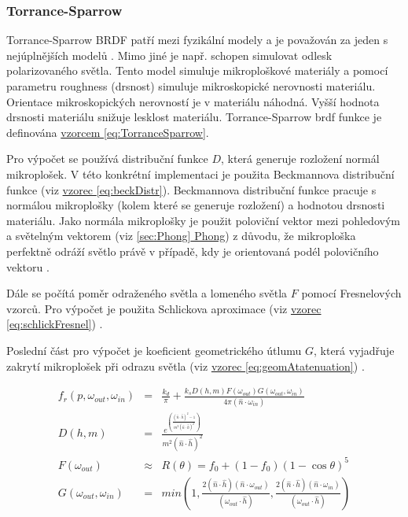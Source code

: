 \documentclass[czech,master,dept460,male,cpp,cpdeclaration]{diploma}
\newcommand{\uvec}[1]{\hat{#1}}
\begin{document}
\subsubsection{Torrance-Sparrow} \label{sec:torrancesparrow}
Torrance-Sparrow BRDF patří mezi fyzikální modely a je považován za jeden s nejúplnějších modelů \cite{BRDFOverview}. Mimo jiné je např. schopen simulovat odlesk polarizovaného světla. Tento model simuluje mikroploškové materiály a pomocí parametru roughness (drsnost) simuluje mikroskopické nerovnosti materiálu. Orientace mikroskopických nerovností je v materiálu náhodná. Vyšší hodnota drsnosti materiálu snižuje lesklost materiálu. Torrance-Sparrow brdf funkce je definována \hyperref[eq:TorranceSparrow]{vzorcem \ref{eq:TorranceSparrow}}. \par
Pro výpočet se používá distribuční funkce \(D\), která generuje rozložení normál mikroplošek. V této konkrétní implementaci je použita Beckmannova distribuční funkce (viz \hyperref[eq:beckDistr]{vzorec \ref{eq:beckDistr}}). Beckmannova distribuční funkce pracuje s normálou mikroplošky (kolem které se generuje rozložení) a hodnotou drsnosti materiálu. Jako normála mikroplošky je použit poloviční vektor mezi pohledovým a světelným vektorem (viz \hyperref[sec:Phong]{\ref{sec:Phong} Phong}) z důvodu, že mikroploška perfektně odráží světlo právě v případě, kdy je orientovaná podél polovičního vektoru \cite{PHARR2017507}. \par
Dále se počítá poměr odraženého světla a lomeného světla \(F\) pomocí Fresnelových vzorců. Pro výpočet je použita Schlickova aproximace (viz \hyperref[eq:schlickFresnel]{vzorec \ref{eq:schlickFresnel}}) \cite{SchlickFresnel}. \par
Poslední část pro výpočet je koeficient geometrického útlumu \(G\), která vyjadřuje zakrytí mikroplošek při odrazu světla (viz \hyperref[eq:geomAtatenuation]{vzorec \ref{eq:geomAtatenuation}}) \cite{BRDFOverview}.


\begin{eqnarray}
    f_r\left(p,\omega_{out},\omega_{in}\right) & = & \frac{k_d}{\pi} + \frac{k_s D(h,m) F(\omega_{out}) G(\omega_{out},\omega_{in})}{4\pi (\uvec{n}\cdot \omega_{in})}\label{eq:TorranceSparrow}\\
    D(h,m) & = & \frac{e^{\left(\frac{(\uvec{n}\cdot \uvec{h})^2-1}{m^2(\uvec{n}\cdot \uvec{h})^2}\right)}}{m^2(\uvec{n}\cdot \uvec{h})^2}\label{eq:beckDistr}\\
    F(\omega_{out}) & \approx & R(\theta) = f_0 + (1-f_0)(1-\cos\theta)^5\label{eq:schlickFresnel}\\
    G(\omega_{out},\omega_{in}) & = & min \left( 1, \frac{2 ( \uvec{n} \cdot \uvec{h} ) ( \uvec{n} \cdot \omega_{out} )
        }{ ( \omega_{out} \cdot \uvec{h} ) },\frac{ 2 ( \uvec{n} \cdot \uvec{h} ) ( \uvec{n} \cdot \omega_{in} ) }{ ( \omega_{out} \cdot \uvec{h} ) } \right) \label{eq:geomAtatenuation}
\end{eqnarray}
\end{document}

